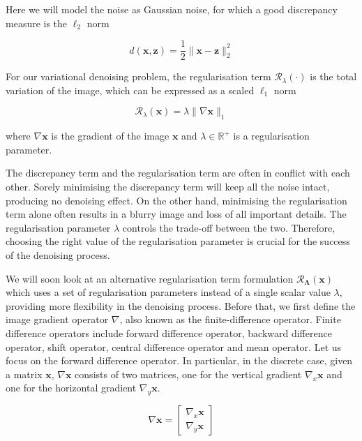 \documentclass[12pt]{article}
\begin{document}
Here we will model the noise as Gaussian noise, for which a good discrepancy measure is the $\ell_2$ norm

\begin{equation}
  d(\mathbf{x}, \mathbf{z}) = \frac{1}{2} \|\mathbf{x} - \mathbf{z}\|_2^2
\end{equation}

For our variational denoising problem, the regularisation term $\mathcal{R}_{\lambda}(\cdot)$ is the total variation of the image, which can be expressed as a scaled $\ell_1$ norm

\begin{equation}
  \mathcal{R}_{\lambda}(\mathbf{x}) = \lambda \| \nabla \mathbf{x} \|_1
\end{equation}

where $\nabla \mathbf{x}$ is the gradient of the image $\mathbf{x}$ and $\lambda \in \mathbb{R}^{+}$ is a regularisation parameter.

The discrepancy term and the regularisation term are often in conflict with each other. Sorely minimising the discrepancy term will keep all the noise intact, producing no denoising effect. On the other hand, minimising the regularisation term alone often results in a blurry image and loss of all important details. The regularisation parameter $\lambda$ controls the trade-off between the two. Therefore, choosing the right value of the regularisation parameter is crucial for the success of the denoising process.

We will soon look at an alternative regularisation term formulation $\mathcal{R}_{\mathbf{\Lambda}}(\mathbf{x})$ which uses a set of regularisation parameters instead of a single scalar value $\lambda$, providing more flexibility in the denoising process. Before that, we first define the image gradient operator $\nabla$, also known as the finite-difference operator.
Finite difference operators include forward difference operator,
backward difference operator, shift operator, central difference operator and mean operator.
Let us focus on the forward difference operator. In particular, in the discrete case, given a matrix $\mathbf{x}$, $\nabla \mathbf{x}$ consists of two matrices, one for the vertical gradient $\nabla_{x} \mathbf{x}$ and one for the horizontal gradient $\nabla_{y} \mathbf{x}$.


\begin{equation}
  \nabla \mathbf{x} = \begin{bmatrix}
    \nabla_{x} \mathbf{x} \\
    \nabla_{y} \mathbf{x}
  \end{bmatrix}
\end{equation}
\end{document}
